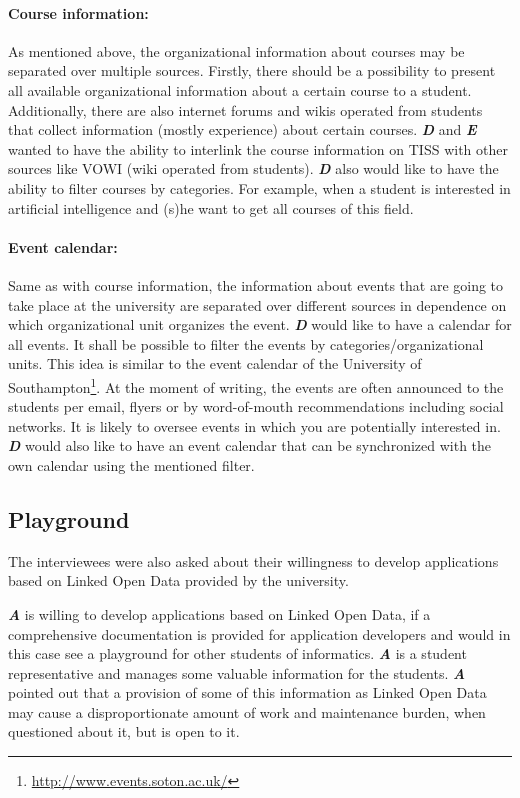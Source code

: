\documentclass{article}
\begin{document}
\paragraph{Course information:} As mentioned above, the organizational information about courses may be separated over multiple sources. Firstly, there should be a possibility to present all available organizational information about a certain course to a student. Additionally, there are also internet forums and wikis operated from students that collect information (mostly experience) about certain courses. \textit{\textbf{D}} and \textit{\textbf{E}} wanted to have the ability to interlink the course information on TISS with other sources like VOWI (wiki operated from students). \textit{\textbf{D}} also would like to have the ability to filter courses by categories. For example, when a student is interested in artificial intelligence and (s)he want to get all courses of this field. 

\paragraph{Event calendar:} Same as with course information, the information about events that are going to take place at the university are separated over different sources in dependence on which organizational unit organizes the event. \textit{\textbf{D}} would like to have a calendar for all events. It shall be possible to filter the events by categories/organizational units. This idea is similar to the event calendar of the University of Southampton\footnote{\url{http://www.events.soton.ac.uk/}}. At the moment of writing, the events are often announced to the students per email, flyers or by word-of-mouth recommendations including social networks. It is likely to oversee events in which you are potentially interested in. \textit{\textbf{D}} would also like to have an event calendar that can be synchronized with the own calendar using the mentioned filter.

\subsection{Playground}
\label{lod-benefits-challenges:playground}
The interviewees were also asked about their willingness to develop applications based on Linked Open Data provided by the university. 

\textit{\textbf{A}} is willing to develop applications based on Linked Open Data, if a comprehensive documentation is provided for application developers and would in this case see a playground for other students of informatics. \textit{\textbf{A}} is a student representative and manages some valuable information for the students. \textit{\textbf{A}} pointed out that a provision of some of this information as Linked Open Data may cause a disproportionate amount of work and maintenance burden, when questioned about it, but is open to it.
\end{document}
